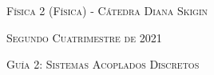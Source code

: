 \documentclass[11pt,spanish]{article}
\begin{document}
    \begin{center}
    \textsc{\large Física 2 (Física) - Cátedra Diana Skigin}
    \par\end{center}{\large \par}
    
    \begin{center}
    \textsc{\large Segundo Cuatrimestre de 2021}
    \par\end{center}{\large \par}
    
    \begin{center}
    \textsc{\large Guía 2: Sistemas Acoplados Discretos}
    \par\end{center}{\large \par}
\end{document}
